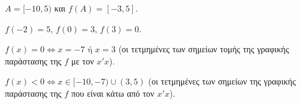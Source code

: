 
\begin{alist}
\item $A = [-10, 5)$ και $f(A) = [-3, 5]$.

\item $f(-2) = 5$, $f(0)= 3$, $f(3) = 0$.

\item $f(x) = 0 \Leftrightarrow x = -7 \text{ ή } x = 3$ (οι τετμημένες των σημείων τομής της γραφικής παράστασης της $f$ με τον $x'x$).

\item $f(x) < 0 \Leftrightarrow x \in [-10, -7) \cup (3, 5)$ (οι τετμημένες των σημείων της γραφικής παράστασης της $f$ που είναι κάτω από τον $x'x$).
\end{alist}

